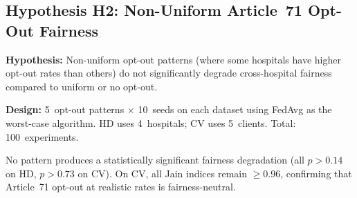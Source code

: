 \documentclass[conference]{IEEEtran}
\begin{document}
\subsection{Hypothesis H2: Non-Uniform Article~71 Opt-Out Fairness}
\label{sec:h2_optout}

\textbf{Hypothesis:} Non-uniform opt-out patterns (where some hospitals have higher opt-out rates than others) do not significantly degrade cross-hospital fairness compared to uniform or no opt-out.

\textbf{Design:} 5~opt-out patterns $\times$ 10~seeds on each dataset using FedAvg as the worst-case algorithm. HD uses 4~hospitals; CV uses 5~clients. Total: 100~experiments.

\begin{table}[htbp]
\centering
\caption{H2: Non-Uniform Article~71 Opt-Out Impact on Fairness. FedAvg, 10 seeds per pattern. Jain index = 1.0 indicates perfect equity; DEI ratio = min/max client accuracy. $p$-values from Wilcoxon rank-sum vs.\ uniform\_0 baseline.}
\label{tab:h2_optout}
\par{\footnotesize No pattern produces a statistically significant fairness degradation (all $p{>}0.14$ on HD, $p{>}0.73$ on CV). On CV, all Jain indices remain $\geq$0.96, confirming that Article~71 opt-out at realistic rates is fairness-neutral.}
\end{table}
\end{document}
